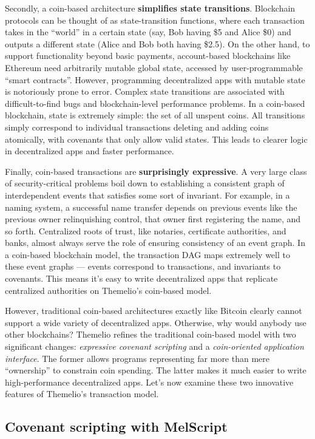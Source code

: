 \documentclass[headinclude,12pt]{scrbook}
\begin{document}
Secondly, a coin-based architecture \textbf{simplifies state transitions}. Blockchain protocols can be thought of as state-transition functions, where each transaction takes in the ``world'' in a certain state (say, Bob having \$5 and Alice \$0) and outputs a different state (Alice and Bob both having \$2.5). On the other hand, to support functionality beyond basic payments, account-based blockchains like Ethereum need arbitrarily mutable global state, accessed by user-programmable ``smart contracts''. However, programming decentralized apps with mutable state is notoriously prone to error. Complex state transitions are associated with difficult-to-find bugs and blockchain-level performance problems. In a coin-based blockchain, state is extremely simple: the set of all unspent coins. All transitions simply correspond to individual transactions deleting and adding coins atomically, with covenants that only allow valid states. This leads to clearer logic in decentralized apps and faster performance.

Finally, coin-based transactions are \textbf{surprisingly expressive}. A very large class of security-critical problems boil down to establishing a consistent graph of interdependent events that satisfies some sort of invariant. For example, in a naming system, a successful name transfer depends on previous events like the previous owner relinquishing control, that owner first registering the name, and so forth. Centralized roots of trust, like notaries, certificate authorities, and banks, almost always serve the role of ensuring consistency of an event graph. In a coin-based blockchain model, the transaction DAG maps extremely well to these event graphs --- events correspond to transactions, and invariants to covenants. This means it's easy to write decentralized apps that replicate centralized authorities on Themelio's coin-based model.

However, traditional coin-based architectures exactly like Bitcoin clearly cannot support a wide variety of decentralized apps. Otherwise, why would anybody use other blockchains? Themelio refines the traditional coin-based model with two significant changes: \emph{expressive covenant scripting} and a \textit{coin-oriented application interface}. The former allows programs representing far more than mere ``ownership'' to constrain coin spending. The latter makes it much easier to write high-performance decentralized apps. Let's now examine these two innovative features of Themelio's transaction model.

\subsection{Covenant scripting with MelScript} \label{ss:melscript}
\end{document}
